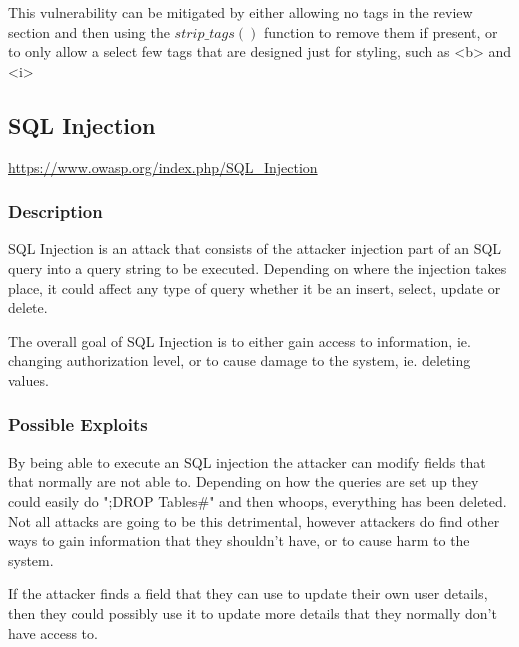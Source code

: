 \documentclass[titlepage]{article}
\begin{document}
      This vulnerability can be mitigated by either allowing no tags in the review section and then using the $strip\_tags()$ function to remove them if present, or to only allow a select few tags that are designed just for styling, such as <b> and <i>



   \subsection{SQL Injection} %
   \label{sub:sql_injection}

      \url{https://www.owasp.org/index.php/SQL_Injection}
   
      \subsubsection{Description} %
      \label{ssub:sql_injection_description}
      
      SQL Injection is an attack that consists of the attacker injection part of an SQL query into a query string to be executed. Depending on where the injection takes place, it could affect any type of query whether it be an insert, select, update or delete.

      The overall goal of SQL Injection is to either gain access to information, ie. changing authorization level, or to cause damage to the system, ie. deleting values.


      \subsubsection{Possible Exploits} %
      \label{ssub:sql_injection_possible_exploits}
      
      By being able to execute an SQL injection the attacker can modify fields that that normally are not able to. Depending on how the queries are set up they could easily do ";DROP Tables\#" and then whoops, everything has been deleted. Not all attacks are going to be this detrimental, however attackers do find other ways to gain information that they shouldn't have, or to cause harm to the system.

      If the attacker finds a field that they can use to update their own user details, then they could possibly use it to update more details that they normally don't have access to. 
\end{document}
